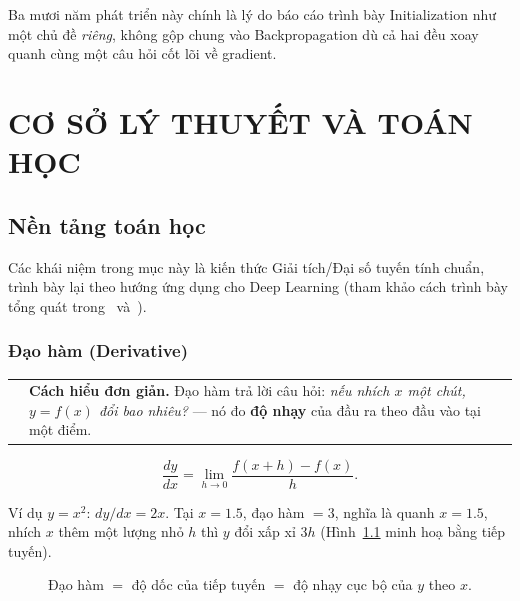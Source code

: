 \documentclass[12pt,a4paper]{report}
\makeatletter
\newenvironment{tructiep}[1][Cách hiểu đơn giản]
  {\par\smallskip\noindent\begin{tabular}{@{}p{0.35em}@{\hspace{6pt}}p{\dimexpr\linewidth-1.9em\relax}@{}}
   \textcolor{boxln}{\rule{2pt}{\baselineskip}} & \textbf{#1.}\enspace\ignorespaces}
  {\end{tabular}\par\smallskip}
\renewcommand\footnotesize{\@setfontsize\footnotesize{13}{16}}
\makeatother
\begin{document}
Ba mươi năm phát triển này chính là lý do báo cáo trình bày Initialization
như một chủ đề \emph{riêng}, không gộp chung vào Backpropagation dù cả
hai đều xoay quanh cùng một câu hỏi cốt lõi về gradient.

\chapter{CƠ SỞ LÝ THUYẾT VÀ TOÁN HỌC}
\section{Nền tảng toán học}

Các khái niệm trong mục này là kiến thức Giải tích/Đại số tuyến tính chuẩn,
trình bày lại theo hướng ứng dụng cho Deep Learning (tham khảo cách trình
bày tổng quát trong~\citet{bishop2006pattern} và~\citet{goodfellow2016deep}).

\subsection{Đạo hàm (Derivative)}

\begin{tructiep}
Đạo hàm trả lời câu hỏi: \emph{nếu nhích $x$ một chút, $y=f(x)$ đổi bao
nhiêu?} --- nó đo \textbf{độ nhạy} của đầu ra theo đầu vào tại một điểm.
\end{tructiep}

$$\frac{dy}{dx} = \lim_{h\to 0}\frac{f(x+h)-f(x)}{h}.$$

Ví dụ $y=x^2$: $dy/dx=2x$. Tại $x=1.5$, đạo hàm $=3$, nghĩa là quanh
$x=1.5$, nhích $x$ thêm một lượng nhỏ $h$ thì $y$ đổi xấp xỉ $3h$ (Hình~\ref{fig:deriv}
minh hoạ bằng tiếp tuyến).

\begin{figure}[htbp]
\centering
{}
\caption{Đạo hàm $=$ độ dốc của tiếp tuyến $=$ độ nhạy cục bộ của $y$ theo $x$.}
\label{fig:deriv}
\end{figure}
\end{document}
